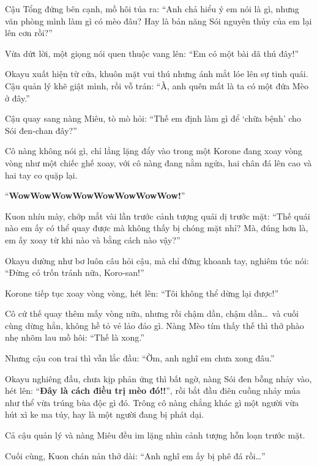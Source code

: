 \documentclass[../main.tex]{subfiles}
\begin{document}
Cậu Tổng đứng bên cạnh, mồ hôi túa ra: ``Anh chả hiểu ý em nói là gì, nhưng văn phòng mình làm gì có mèo đâu? Hay là bản năng Sói nguyên thủy của em lại lên cơn rồi?''

Vừa dứt lời, một giọng nói quen thuộc vang lên: ``Em có một bài dã thú đây!''


Okayu xuất hiện từ cửa, khuôn mặt vui thú nhưng ánh mắt lóe lên sự tinh quái. Cậu quản lý khẽ giật mình, rồi vỗ trán: ``À, anh quên mất là ta có một đứa Mèo ở đây.''

Cậu quay sang nàng Miêu, tò mò hỏi: ``Thế em định làm gì để `chữa bệnh' cho Sói đen-chan đây?''

Cô nàng không nói gì, chỉ lẳng lặng đẩy vào trong một Korone đang xoay vòng vòng như một chiếc ghế xoay, với cô nàng đang nằm ngửa, hai chân đá lên cao và hai tay co quặp lại.


``\textbf{WowWowWowWowWowWowWowWow!}''

Kuon nhíu mày, chớp mắt vài lần trước cảnh tượng quái dị trước mặt: ``Thế quái nào em ấy có thể quay được mà không thấy bị chóng mặt nhỉ? Mà, đúng hơn là, em ấy xoay từ khi nào và bằng cách nào vậy?''

Okayu dường như bơ luôn câu hỏi cậu, mà chỉ đứng khoanh tay, nghiêm túc nói: ``Đừng có trốn tránh nữa, Koro-san!''

Korone tiếp tục xoay vòng vòng, hét lên: ``Tôi không thể dừng lại được!''

Cô cứ thế quay thêm mấy vòng nữa, nhưng rồi chậm dần, chậm dần\dots\ và cuối cùng dừng hẳn, không hề tỏ vẻ lảo đảo gì. Nàng Mèo tím thấy thế thì thở phào nhẹ nhõm lau mồ hôi: ``Thế là xong.''

Nhưng cậu con trai thì vẫn lắc đầu: ``Ờm, anh nghĩ em chưa xong đâu.''

Okayu nghiêng đầu, chưa kịp phản ứng thì bất ngờ, nàng Sói đen bỗng nhảy vào, hét lên: ``\textbf{Đây là cách điều trị mèo đó!!}'', rồi bắt đầu điên cuồng nhảy múa như thể vừa trúng bùa độc gì đó. Trông cô nàng chẳng khác gì một người vừa hút xì ke ma túy, hay là một người đang bị phát dại.


Cả cậu quản lý và nàng Miêu đều im lặng nhìn cảnh tượng hỗn loạn trước mặt.

Cuối cùng, Kuon chán nản thở dài: ``Anh nghĩ em ấy bị phê đá rồi\dots''

\subsection*{\label{ep-S13.VII}}
\end{document}
